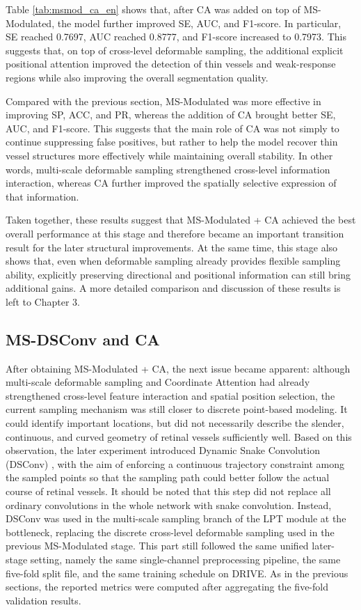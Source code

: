 \documentclass[a4paper,12pt]{article}
\begin{document}
Table \ref{tab:msmod_ca_en} shows that, after CA was added on top of MS-Modulated, the model further improved SE, AUC, and F1-score. In particular, SE reached 0.7697, AUC reached 0.8777, and F1-score increased to 0.7973. This suggests that, on top of cross-level deformable sampling, the additional explicit positional attention improved the detection of thin vessels and weak-response regions while also improving the overall segmentation quality.

Compared with the previous section, MS-Modulated was more effective in improving SP, ACC, and PR, whereas the addition of CA brought better SE, AUC, and F1-score. This suggests that the main role of CA was not simply to continue suppressing false positives, but rather to help the model recover thin vessel structures more effectively while maintaining overall stability. In other words, multi-scale deformable sampling strengthened cross-level information interaction, whereas CA further improved the spatially selective expression of that information.

Taken together, these results suggest that MS-Modulated + CA achieved the best overall performance at this stage and therefore became an important transition result for the later structural improvements. At the same time, this stage also shows that, even when deformable sampling already provides flexible sampling ability, explicitly preserving directional and positional information can still bring additional gains. A more detailed comparison and discussion of these results is left to Chapter 3.

\subsection{MS-DSConv and CA}

After obtaining MS-Modulated + CA, the next issue became apparent: although multi-scale deformable sampling and Coordinate Attention had already strengthened cross-level feature interaction and spatial position selection, the current sampling mechanism was still closer to discrete point-based modeling. It could identify important locations, but did not necessarily describe the slender, continuous, and curved geometry of retinal vessels sufficiently well. Based on this observation, the later experiment introduced Dynamic Snake Convolution (DSConv) \cite{qi2023dsc}, with the aim of enforcing a continuous trajectory constraint among the sampled points so that the sampling path could better follow the actual course of retinal vessels. It should be noted that this step did not replace all ordinary convolutions in the whole network with snake convolution. Instead, DSConv was used in the multi-scale sampling branch of the LPT module at the bottleneck, replacing the discrete cross-level deformable sampling used in the previous MS-Modulated stage. This part still followed the same unified later-stage setting, namely the same single-channel preprocessing pipeline, the same five-fold split file, and the same training schedule on DRIVE. As in the previous sections, the reported metrics were computed after aggregating the five-fold validation results.
\end{document}
